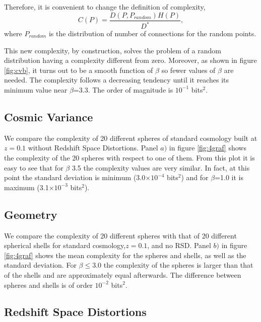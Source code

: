 \documentclass[fleqn,usenatbib]{mnras}
\begin{document}
Therefore, it is convenient to change the definition of complexity, 
\begin{equation}
    C(P)=\frac{D(P,P_{random})H(P)}{D^{*}},
    \label{eq:comp_def2}
\end{equation}
where $P_{random}$ is the distribution of number of connections for
the random points. 

This new complexity, by construction, solves the problem of a random
distribution having a complexity different from zero. Moreover, as
shown in figure \ref{fig:cvb}, it turns out to be a smooth function of
$\beta$ so fewer values of $\beta$ are needed. The complexity follows
a decreasing tendency until it reaches its minimum value near
$\beta$=3.3. The order of magnitude is $10^{-1}$ bits$^{2}$. 

\subsection{Cosmic Variance}

We compare the complexity of 20 different spheres of standard
cosmology built at $z=0.1$ without Redshift Space Distortions. Panel
$a)$ in figure \ref{fig:4graf} shows the complexity of the 20 spheres
with respect to one of them. From this plot it is easy to see that for
$\beta$ 3.5 the complexity values are very similar. In fact, at this
point the standard deviation is minimum (3.0$\times10^{-4}$
bits$^{2}$) and for $\beta$=1.0 it is maximum (3.1$\times10^{-3}$
bits$^{2}$).  



\subsection{Geometry}

We compare the complexity of 20 different spheres with that of 20
different spherical shells for standard cosmology,$z=0.1$, and no
RSD. Panel $b)$ in figure \ref{fig:4graf} shows the mean complexity
for the spheres and shells, as well as the standard deviation. For
$\beta\leq3.0$ the complexity of the spheres is larger than that of
the shells and are approximately equal afterwards. The difference
between spheres and shells is of order $10^{-2}$ bits$^{2}$. 




\subsection{Redshift Space Distortions}
\end{document}
